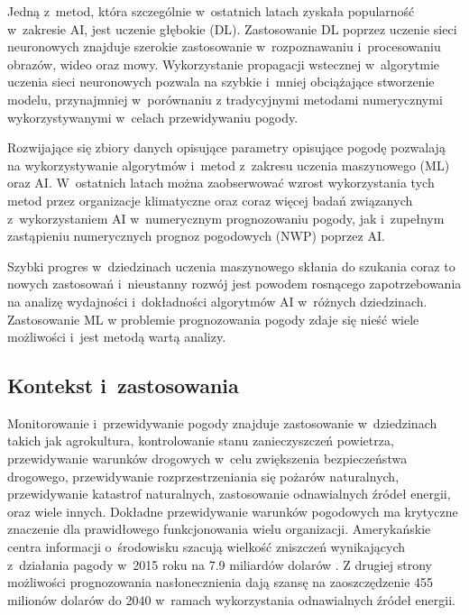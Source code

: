 Jedną z~metod, która szczególnie w~ostatnich latach zyskała popularność w~zakresie
AI, jest uczenie głębokie (DL). Zastosowanie DL poprzez uczenie sieci neuronowych
znajduje szerokie zastosowanie w~rozpoznawaniu i~procesowaniu obrazów, wideo oraz
mowy. Wykorzystanie propagacji wstecznej w~algorytmie uczenia sieci neuronowych
pozwala na szybkie i~mniej obciążające stworzenie modelu, przynajmniej w~porównaniu
z tradycyjnymi metodami numerycznymi wykorzystywanymi w~celach przewidywaniu pogody.

Rozwijające się zbiory danych opisujące parametry opisujące pogodę 
pozwalają na wykorzystywanie algorytmów i~metod z~zakresu uczenia maszynowego (ML)
oraz AI. W~ostatnich latach można zaobserwować wzrost wykorzystania tych metod
przez organizacje klimatyczne oraz coraz więcej badań związanych z~wykorzystaniem
AI w~numerycznym prognozowaniu pogody, jak i~zupełnym zastąpieniu numerycznych
prognoz pogodowych (NWP) poprzez AI.

Szybki progres w~dziedzinach uczenia maszynowego skłania do szukania coraz to nowych
zastosowań i~nieustanny rozwój jest powodem rosnącego zapotrzebowania na analizę
wydajności i~dokładności algorytmów AI w~różnych dziedzinach. Zastosowanie ML w
problemie prognozowania pogody zdaje się nieść wiele możliwości i~jest metodą
wartą analizy. 

\subsection*{Kontekst i~zastosowania}\label{subsec:context}

Monitorowanie i~przewidywanie pogody znajduje zastosowanie w~dziedzinach takich
jak agrokultura, kontrolowanie stanu zanieczyszczeń powietrza, 
przewidywanie warunków drogowych w~celu zwiększenia bezpieczeństwa drogowego,
przewidywanie rozprzestrzeniania się pożarów naturalnych,
przewidywanie katastrof naturalnych, zastosowanie odnawialnych źródeł energii,
oraz wiele innych. Dokładne przewidywanie warunków pogodowych ma krytyczne znaczenie
dla prawidłowego funkcjonowania wielu organizacji. Amerykańskie centra
informacji o~środowisku szacują wielkość zniszczeń wynikających z~działania
pagody w~2015 roku na 7.9 miliardów dolarów \cite{using-artificial-intelligence-to-improve}.
Z drugiej strony możliwości prognozowania nasłonecznienia dają szansę na zaoszczędzenie
455 milionów dolarów do 2040 w~ramach wykorzystania odnawialnych źródeł energii.


